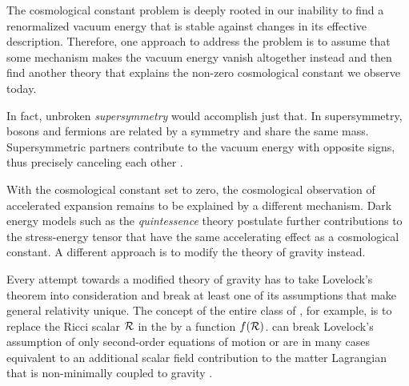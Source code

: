 The cosmological constant problem is deeply rooted in our inability to find a renormalized vacuum energy that is stable against changes in its effective description. Therefore, one approach to address the problem is to assume that some mechanism makes the vacuum energy vanish altogether instead and then find another theory that explains the non-zero cosmological constant we observe today.

In fact, unbroken \emph{supersymmetry} would accomplish just that. In supersymmetry, bosons and fermions are related by a symmetry and share the same mass. Supersymmetric partners contribute to the vacuum energy with opposite signs, thus precisely canceling each other \autocite{Martin1997}.

With the cosmological constant set to zero, the cosmological observation of accelerated expansion remains to be explained by a different mechanism. Dark energy models such as the \emph{quintessence} theory \autocite{Wetterich1988,Ratra1988} postulate further contributions to the stress-energy tensor that have the same accelerating effect as a cosmological constant. A different approach is to modify the theory of gravity instead.

Every attempt towards a modified theory of gravity has to take Lovelock's theorem into consideration and break at least one of its assumptions that make general relativity unique. The concept of the entire class of , for example, is to replace the Ricci scalar \(\mathcal{R}\) in the  by a function \(f(\mathcal{R})\).
 can break Lovelock's assumption of only second-order equations of motion or are in many cases equivalent to an additional scalar field contribution to the matter Lagrangian that is non-minimally coupled to gravity \autocite{Clifton2012,Euclid2013}.

